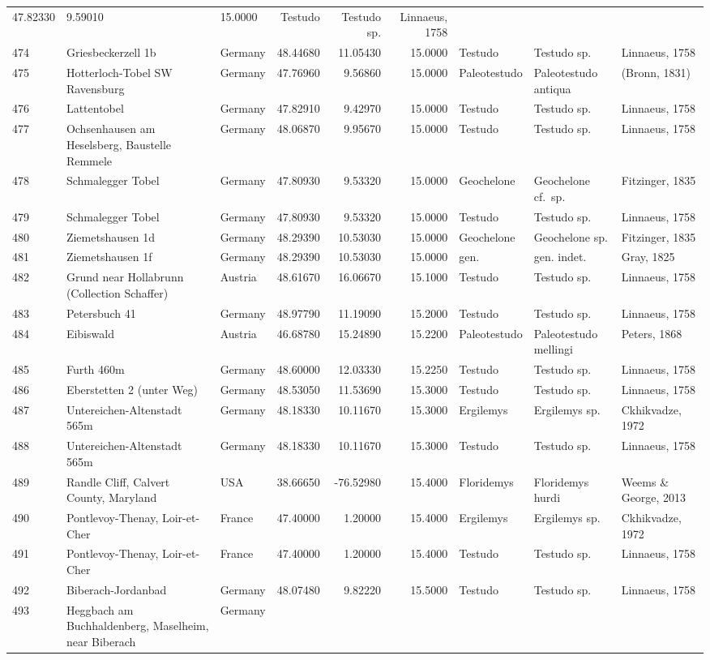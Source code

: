 \begin{landscape}
{\begin{longtable}[]{@{}lllrrrlll@{}}
47.82330 & 9.59010 & 15.0000 & Testudo & Testudo sp. & Linnaeus,
1758\tabularnewline
474 & Griesbeckerzell 1b & Germany & 48.44680 & 11.05430 & 15.0000 &
Testudo & Testudo sp. & Linnaeus, 1758\tabularnewline
475 & Hotterloch-Tobel SW Ravensburg & Germany & 47.76960 & 9.56860 &
15.0000 & Paleotestudo & Paleotestudo antiqua & (Bronn,
1831)\tabularnewline
476 & Lattentobel & Germany & 47.82910 & 9.42970 & 15.0000 & Testudo &
Testudo sp. & Linnaeus, 1758\tabularnewline
477 & Ochsenhausen am Heselsberg, Baustelle Remmele & Germany & 48.06870
& 9.95670 & 15.0000 & Testudo & Testudo sp. & Linnaeus,
1758\tabularnewline
478 & Schmalegger Tobel & Germany & 47.80930 & 9.53320 & 15.0000 &
Geochelone & Geochelone cf.~sp. & Fitzinger, 1835\tabularnewline
479 & Schmalegger Tobel & Germany & 47.80930 & 9.53320 & 15.0000 &
Testudo & Testudo sp. & Linnaeus, 1758\tabularnewline
480 & Ziemetshausen 1d & Germany & 48.29390 & 10.53030 & 15.0000 &
Geochelone & Geochelone sp. & Fitzinger, 1835\tabularnewline
481 & Ziemetshausen 1f & Germany & 48.29390 & 10.53030 & 15.0000 & gen.
& gen. indet. & Gray, 1825\tabularnewline
482 & Grund near Hollabrunn (Collection Schaffer) & Austria & 48.61670 &
16.06670 & 15.1000 & Testudo & Testudo sp. & Linnaeus,
1758\tabularnewline
483 & Petersbuch 41 & Germany & 48.97790 & 11.19090 & 15.2000 & Testudo
& Testudo sp. & Linnaeus, 1758\tabularnewline
484 & Eibiswald & Austria & 46.68780 & 15.24890 & 15.2200 & Paleotestudo
& Paleotestudo mellingi & Peters, 1868\tabularnewline
485 & Furth 460m & Germany & 48.60000 & 12.03330 & 15.2250 & Testudo &
Testudo sp. & Linnaeus, 1758\tabularnewline
486 & Eberstetten 2 (unter Weg) & Germany & 48.53050 & 11.53690 &
15.3000 & Testudo & Testudo sp. & Linnaeus, 1758\tabularnewline
487 & Untereichen-Altenstadt 565m & Germany & 48.18330 & 10.11670 &
15.3000 & Ergilemys & Ergilemys sp. & Ckhikvadze, 1972\tabularnewline
488 & Untereichen-Altenstadt 565m & Germany & 48.18330 & 10.11670 &
15.3000 & Testudo & Testudo sp. & Linnaeus, 1758\tabularnewline
489 & Randle Cliff, Calvert County, Maryland & USA & 38.66650 &
-76.52980 & 15.4000 & Floridemys & Floridemys hurdi & Weems \& George,
2013\tabularnewline
490 & Pontlevoy-Thenay, Loir-et-Cher & France & 47.40000 & 1.20000 &
15.4000 & Ergilemys & Ergilemys sp. & Ckhikvadze, 1972\tabularnewline
491 & Pontlevoy-Thenay, Loir-et-Cher & France & 47.40000 & 1.20000 &
15.4000 & Testudo & Testudo sp. & Linnaeus, 1758\tabularnewline
492 & Biberach-Jordanbad & Germany & 48.07480 & 9.82220 & 15.5000 &
Testudo & Testudo sp. & Linnaeus, 1758\tabularnewline
493 & Heggbach am Buchhaldenberg, Maselheim, near Biberach & Germany &

\end{longtable}}
\end{landscape}
